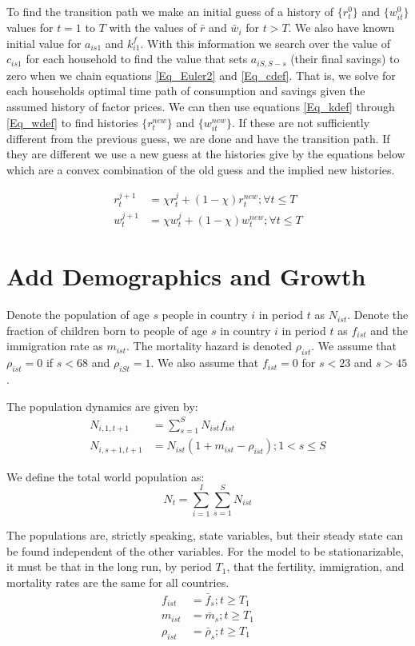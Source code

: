 \documentclass[letterpaper,12pt]{article}
\theoremstyle{definition}
\numberwithin{equation}{section}
\begin{document}
\begin{spacing}{1.5}
	To find the transition path we make an initial guess of a history of $\{r^0_t\}$ and $\{w^0_{it}\}$ values for $t=1$ to $T$ with the values of $\bar r$ and $\bar w_i$ for $t>T$.  We also have  known initial value for $a_{is1}$ and $k^f_{i1}$. With this information we search over the value of $c_{is1}$ for each household to find the value that sets $a_{iS,S-s}$ (their final savings) to zero when we chain equations \eqref{Eq_Euler2} and \eqref{Eq_cdef}.  That is, we solve for each households optimal time path of consumption and savings given the assumed history of factor prices.  We can then use equations \eqref{Eq_kdef} through \eqref{Eq_wdef} to find histories $\{r^{new}_t\}$ and $\{w^{new}_{it}\}$.  If these are not sufficiently different from the previous guess, we are done and have the transition path.  If they are different we use a new guess at the histories give by the equations below which are a convex combination of the old guess and the implied new histories.

	\begin{align}
		r^{j+1}_t & = \chi r^{j}_t + (1-\chi) r^{new}_t; \forall t \le T\\
		w^{j+1}_t & = \chi w^{j}_t + (1-\chi) w^{new}_t; \forall t \le T 
	\end{align}

\section{Add Demographics and Growth}
	Denote the population of age $s$ people in country $i$ in period $t$ as $N_{ist}$.  Denote the fraction of children born to people of age $s$ in country $i$ in period $t$ as $f_{ist}$ and the immigration rate as $m_{ist}$.  The mortality hazard is denoted $\rho_{ist}$.  We assume that $\rho_{ist}=0$ if $s<68$ and $\rho_{iSt}=1$.  We also assume that $f_{ist} = 0$ for $s<23$ and $s>45$.

	The population dynamics are given by:
	\begin{align}
		N_{i,1,t+1} & = \sum_{s=1}^S N_{ist} f_{ist} \\
		N_{i,s+1,t+1} & = N_{ist} (1+m_{ist}-\rho_{ist}); 1<s\le S
	\end{align}

	We define the total world population as:
	\begin{equation}
		N_t = \sum_{i=1}^I \sum_{s=1}^S N_{ist}
	\end{equation}

	The populations are, strictly speaking, state variables, but their steady state can be found independent of the other variables.  For the model to be stationarizable, it must be that in the long run, by period $T_1$, that the fertility, immigration, and mortality rates are the same for all countries.
	\begin{align}
		f_{ist} & = \bar f_s; t \ge T_1 \\
		m_{ist} & = \bar m_s; t \ge T_1 \\
		\rho_{ist} & = \bar \rho_s; t \ge T_1
	\end{align}


\end{spacing}
\end{document}
